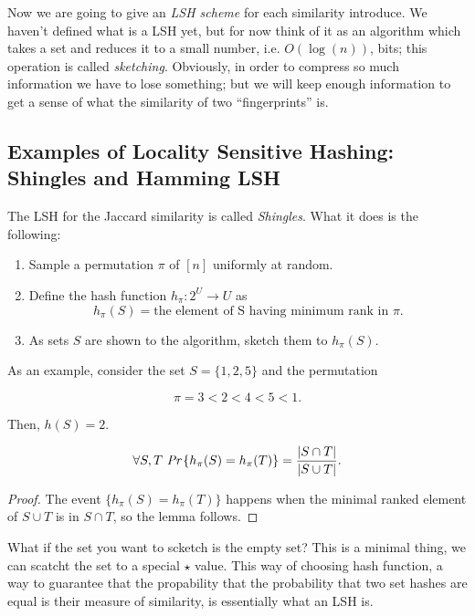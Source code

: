 Now we are going to give an \emph{LSH scheme} for each similarity introduce. We haven't defined what is a LSH yet, but for now think of it as an algorithm which takes a set and reduces it to a small number, i.e. $O(\log(n))$, bits; this operation is called \emph{sketching}. Obviously, in order to compress so much information we have to lose something; but we will keep enough information to get a sense of what the similarity of two ``fingerprints'' is.

\subsection{Examples of Locality Sensitive Hashing: Shingles and Hamming LSH}

The LSH for the Jaccard similarity is called \emph{Shingles}. What it does is the following:

\begin{enumerate}
	\item Sample a permutation $\pi$ of $[n]$ uniformly at random.
	\item Define the hash function $h_\pi : 2^U \rightarrow U$ as
	\begin{equation}
	h_\pi(S) = \text{the element of S having minimum rank in } \pi.
	\end{equation}
	\item As sets $S$ are shown to the algorithm, sketch them to $h_\pi(S)$.
\end{enumerate}

As an example, consider the set $S = \{1, 2, 5\}$ and the permutation 

$$\pi = 3 < 2 < 4 < 5 < 1.$$

Then, $h(S) = 2$.

\begin{lem}
	\begin{equation}
		\forall S, T\ \emph{Pr}\left\{h_\pi(S) = h_\pi(T)\right\} = \frac{|S \cap T|}{|S \cup T|}.
	\end{equation}
\end{lem}
\begin{proof}
	The event $\{h_\pi(S) = h_\pi(T)\}$ happens when the minimal ranked element of $S\cup T$ is in $S \cap T$, so the lemma follows.
\end{proof}

What if the set you want to scketch is the empty set? This is a minimal thing, we can scatcht the set to a special $\star$ value. This way of choosing hash function, a way to guarantee that the propability that the probability that two set hashes are equal is their measure of similarity, is essentially what an LSH is.

